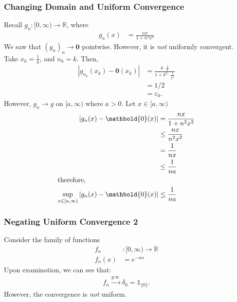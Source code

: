 \documentclass[10pt]{extarticle}
\renewcommand{\mathbf}[1]{\mathbold{#1}}
\newcommand{\R}{\mathbb{R}}
\begin{document}
    \subsubsection{Changing Domain and Uniform Convergence}%
    Recall $g_n: [0,\infty)\rightarrow \R$, where
    \begin{align*}
      g_n(x) &= \frac{nx}{1 + n^2x^2}
    \end{align*}
    We saw that $(g_n)_n \rightarrow \mathbf{0}$ pointwise. However, it is \textit{not} uniformly convergent. Take $x_k = \frac{1}{k}$, and $n_k = k$. Then,
    \begin{align*}
      \left|g_{n_k}(x_k) - \mathbf{0}(x_k)\right| &= \frac{k\cdot \frac{1}{k}}{1 + k^2\cdot \frac{1}{k^2}}\\
                                                  &= 1/2\\
                                                  &= \varepsilon_0.
    \end{align*}
    However, $g_n \rightarrow g$ on $[a,\infty)$ where $a > 0$. Let $x\in[a,\infty)$
    \begin{align*}
      \left|g_n(x) - \mathbf{0}(x)\right| &= \frac{nx}{1 + n^2x^2}\\
                                          &\leq \frac{nx}{n^2x^2}\\
                                          &= \frac{1}{nx}\\
                                          &\leq \frac{1}{na}\\
                                          \shortintertext{therefore,}
      \sup_{x\in[a,\infty)}\left|g_{n}(x)-\mathbf{0}(x)\right| &\leq \frac{1}{na}
    \end{align*}
    \subsubsection{Negating Uniform Convergence 2}%
    Consider the family of functions
    \begin{align*}
      f_n&: [0,\infty) \rightarrow \R\\
      f_n(x) &= e^{-nx}
    \end{align*}
    Upon examination, we can see that:
    \begin{align*}
      f_n \xrightarrow{\text{p.w.}} \delta_0 = \mathbb{1}_{\{0\}}.
    \end{align*}
    However, the convergence is \textit{not} uniform.\\
\end{document}
